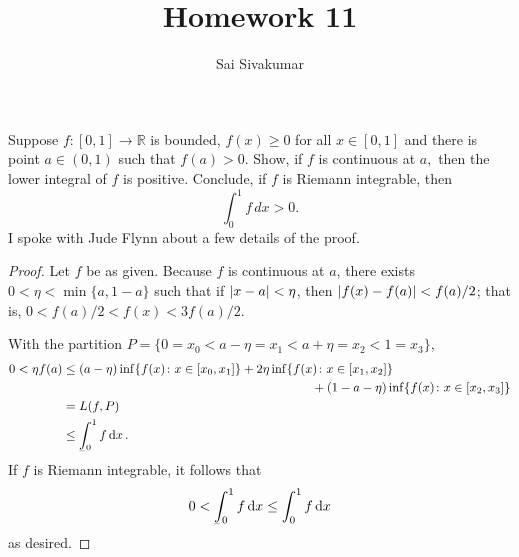 \documentclass[12pt]{amsart}
\title{Homework 11}
\author{Sai Sivakumar}
\begin{document}
\maketitle

Suppose $f:[0,1]\to\mathbb{R}$ is bounded, $f(x)\ge 0$ for all $x\in [0,1]$ and there 
 is point $a\in (0,1)$ such that $f(a)>0.$ Show, if $f$ is continuous at $a,$
 then  the lower integral
 of $f$ is positive.  Conclude, if $f$ is Riemann integrable, then
\[
 \int_0^1 f\, dx >0.
\]
I spoke with Jude Flynn about a few details of the proof.
\begin{proof}
Let $f$ be as given. Because $f$ is continuous at $a$, there exists $0 < \eta< \min\{a, 1-a\}$ such that if $\abs{x-a} < \eta$, then $\abs{f(x) - f(a)} < f(a)/2$; that is, $0 < f(a)/2 < f(x) < 3f(a)/2$.

With the partition $P = \{0=x_0 < a-\eta=x_1 < a+\eta=x_2 < 1=x_3\}$, \begin{align*}
    0 < \eta f(a) &\leq (a-\eta) \inf\{f(x)\colon x\in[x_0,x_1]\} + 2\eta \inf\{f(x)\colon x\in[x_1,x_2]\}\\
    &\hspace*{7cm}+ (1-a-\eta)\inf\{f(x)\colon x\in[x_2,x_3]\}\\
    &= L(f,P) \\
    &\leq \lefteqn{\int_0^1 f}\lefteqn{\hspace{0.0ex}\rule[-2.25ex]{1ex}{.05ex}}
    \phantom{\int_0^1 f}\dd{x}.
\end{align*}
If $f$ is Riemann integrable, it follows that
\[0 < \lefteqn{\int_0^1 f}\lefteqn{\hspace{0.0ex}\rule[-2.25ex]{1ex}{.05ex}}
\phantom{\int_0^1 f}\dd{x} \leq \int_0^1 f\dd{x}\]
as desired.
\end{proof}
\end{document}
